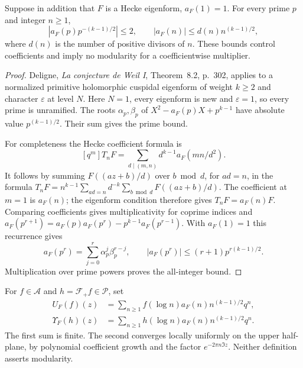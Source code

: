 \begin{proposition}
\label{v4-arith:pres57:deligne}
Suppose in addition that $F$ is a Hecke eigenform, $a_F(1)=1$.
For every prime $p$ and integer $n\ge1$,
\[
 |a_F(p)p^{-(k-1)/2}|\le2,\qquad
 |a_F(n)|\le d(n)n^{(k-1)/2},
\]
where $d(n)$ is the number of positive divisors of $n$.
These bounds control coefficients and imply no modularity for a
coefficientwise multiplier.
\end{proposition}
\begin{proof}
Deligne, \emph{La conjecture de Weil I}, Theorem~8.2, p.~302,
applies to a normalized primitive holomorphic cuspidal eigenform
of weight $k\ge2$ and character $\varepsilon$ at level $N$.
Here $N=1$, every eigenform is new and $\varepsilon=1$, so every
prime is unramified. The roots $\alpha_p,\beta_p$ of
$X^2-a_F(p)X+p^{k-1}$ have absolute value $p^{(k-1)/2}$.
Their sum gives the prime bound.

For completeness the Hecke coefficient formula is
\[
 [q^m]T_nF=\sum_{d\mid(m,n)}d^{k-1}a_F(mn/d^2).
\]
It follows by summing $F((az+b)/d)$ over $b\bmod d$, for $ad=n$,
in the formula $T_nF=n^{k-1}\sum_{ad=n}d^{-k}\sum_{b\bmod d}F((az+b)/d)$.
The coefficient at $m=1$ is $a_F(n)$; the eigenform condition
therefore gives $T_nF=a_F(n)F$. Comparing coefficients gives
multiplicativity for coprime indices and
$a_F(p^{r+1})=a_F(p)a_F(p^r)-p^{k-1}a_F(p^{r-1})$.
With $a_F(1)=1$ this recurrence gives
\[
 a_F(p^r)=\sum_{j=0}^r\alpha_p^j\beta_p^{r-j},\qquad
 |a_F(p^r)|\le(r+1)p^{r(k-1)/2}.
\]
Multiplication over prime powers proves the all-integer bound.
\end{proof}

\begin{definition}
\label{v4-arith:w5-a:def:upsilon}
For $f\in\mathscr A$ and $h=\mathcal F_+f\in\mathscr P$, set
\begin{equation}
 \begin{aligned}
 U_F(f)(z)&=\sum_{n\ge1}f(\log n)a_F(n)n^{(k-1)/2}q^n,\\
 \Upsilon_F(h)(z)&=\sum_{n\ge1}h(\log n)a_F(n)n^{(k-1)/2}q^n.
 \end{aligned}
 \label{v4-arith:w5-a:eq:upsilon}
\end{equation}
The first sum is finite. The second converges locally uniformly
on the upper half-plane, by polynomial coefficient growth and
the factor $e^{-2\pi n\Im z}$.
Neither definition asserts modularity.
\end{definition}

